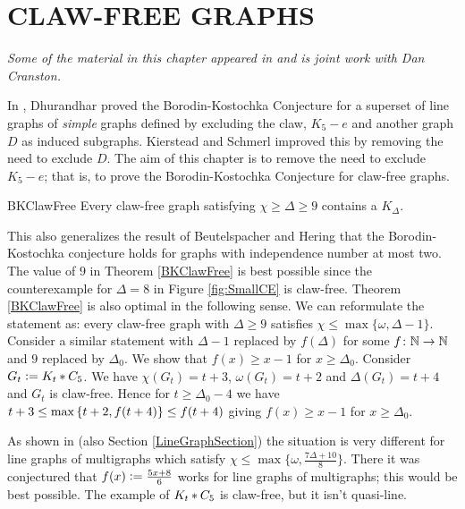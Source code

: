 \chapter{CLAW-FREE GRAPHS}\label{ClawFreeChapter}
\begin{center}
\emph{Some of the material in this chapter appeared in \cite{cranstonrabernclaw} and is joint work with Dan Cranston.}
\end{center}

In \cite{dhurandhar1982improvement}, Dhurandhar proved the Borodin-Kostochka
Conjecture for a superset of line graphs of \emph{simple} graphs defined by excluding the claw, $K_5 - e$ and another graph $D$ as induced subgraphs.  
Kierstead and Schmerl \cite{kierstead1986chromatic} improved this by removing
the need to exclude $D$.  The aim of this chapter is to remove the need to exclude $K_5 - e$; that is, to prove the Borodin-Kostochka
Conjecture for claw-free graphs.

\begin{repthm}{BKClawFree}
Every claw-free graph satisfying $\chi \geq \Delta \geq 9$ contains a
$K_\Delta$.
\end{repthm}

This also generalizes the result of Beutelspacher and Hering \cite{beutelspacher1984minimal} that the
Borodin-Kostochka conjecture holds for graphs with independence number at most
two.  The value of $9$ in Theorem \ref{BKClawFree} is best possible since the
counterexample for $\Delta = 8$ in Figure \ref{fig:SmallCE} is claw-free.
Theorem \ref{BKClawFree} is also optimal in the following sense.  We can
reformulate the statement as: every claw-free graph with $\Delta \geq 9$
satisfies $\chi \leq \max\{\omega, \Delta - 1\}$.  Consider a similar statement
with $\Delta - 1$ replaced by $f(\Delta)$ for some $f\colon \mathbb{N} \rightarrow \mathbb{N}$ and $9$
replaced by $\Delta_0$. We show that $f(x) \geq x - 1$ for $x \geq \Delta_0$. 
Consider $G_t \mathrel{\mathop:}= K_t \mbox{\hspace{2 pt}$\ast$\hspace{2 pt}} C_5$.  We have $\chi(G_t) = t + 3$, $\omega(G_t) = t + 2$
and $\Delta(G_t) = t + 4$ and $G_t$ is claw-free.  Hence for $t \geq \Delta_0
- 4$ we have $t + 3 \leq \max\left\{ t + 2, f(t + 4) \right\} \leq f(t + 4)$ giving $f(x)
\geq x - 1$ for $x \geq \Delta_0$.

As shown in \cite{rabern2011strengthening} (also Section \ref{LineGraphSection}) the situation is very different for
line graphs of multigraphs which satisfy $\chi \leq \max\{\omega,
\frac{7\Delta + 10}{8}\}$.  There it was conjectured that $f(x) \mathrel{\mathop:}=
\frac{5x + 8}{6}$ works for line graphs of multigraphs; this would be best
possible.  The example of $K_t \mbox{\hspace{2 pt}$\ast$\hspace{2 pt}} C_5$ is claw-free, but it isn't
quasi-line.

